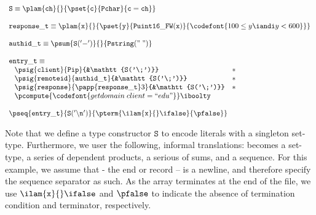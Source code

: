 \[
\begin{array}{l}
\mathtt{S} \equiv \plam {\mathtt{ch}} {} {\pset {\mathtt{c}}
  {\mathtt{Pchar}} {\mathtt{c = ch}}}\\
\\
\mathtt{response\_t} \equiv \plam {\mathtt x} {} {
      \pset {\mathtt y} {\mathtt{Puint16\_FW(x)}} 
      {\codefont{100 \leq y \iandi y < 600}}
    }\\
\\
\mathtt{authid\_t} \equiv 
\psum {\mathtt{S('-')}} {} {\mathtt{Pstring("\;")}}\\
\\
\mathtt{entry\_t} \equiv \\ \;
\begin{array}{lll}
\psig {\mathtt{client}} {\mathtt{Pip}} {&\mathtt{S('\;')}} &* \\
\psig {\mathtt{remoteid}} {\mathtt{authid\_t}} {&\mathtt{S('\;')}} &* \\
\psig {\mathtt{response}} {
  \papp
    {\mathtt{response\_t}} 3
}{&\mathtt{S('\;')}} &*\\
\multicolumn{3}{c}{
\pcompute {\codefont{getdomain\;client = ``edu"}} \iboolty}
\end{array}\\
\\
\pseq {\mathtt{entry\_t}} {\mathtt{S('\backslash n')}}{
  \pterm {\ilam {\mathtt x} {} \ifalse} {\pfalse}
}
\end{array}
\]

Note that we define a type constructor $\mathtt{S}$ to encode literals
with a singleton set-type. Furthermore, we user the following,
informal translations:\Pwhere{} becomes a set-type, \Pstruct{} a
series of dependent products, \Punion{} a serious of sums, and
\Parray{} a sequence. For this example, we assume that \Peor{} - the
end or record -- is a newline, and therefore specify the sequence
separator as such. As the array terminates at the end of the file, we
use $\ilam {\mathtt x} {} \ifalse$ and $\pfalse$ to indicate the
absence of termination condition and terminator, respectively.

